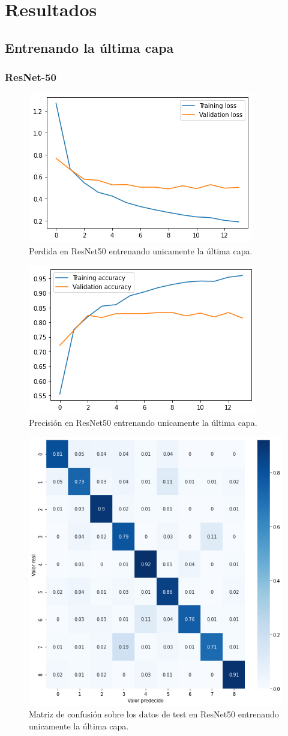 \section{Resultados}


\subsection{Entrenando la última capa}

\subsubsection{ResNet-50}

\begin{figure}[H]
  \centering
  \includegraphics[width=0.5\linewidth]{Imagenes/entrenamiento_redes/ult/resnet_ult_loss.png}
  \caption{Perdida en ResNet50 entrenando unicamente la última capa.}
\end{figure}

\begin{figure}[H]
  \centering
  \includegraphics[width=0.5\linewidth]{Imagenes/entrenamiento_redes/ult/resnet_ult_acc.png}
  \caption{Precisión en ResNet50 entrenando unicamente la última capa.}
\end{figure}

\begin{figure}[H]
  \centering
  \includegraphics[width=0.5\linewidth]{Imagenes/entrenamiento_redes/ult/resnet_ult_matriz.png}
  \caption{Matriz de confusión sobre los datos de test en ResNet50 entrenando unicamente la última capa.}
\end{figure}

